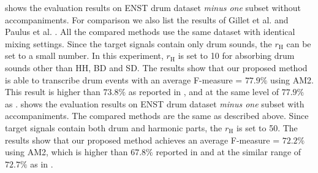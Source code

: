 \documentclass{article}
\begin{document}
 shows the evaluation results on ENST drum dataset \textit{minus one} subset without accompaniments. For comparison we also list the results of Gillet et al. \cite{gillet_transcription_2008} and Paulus et al. \cite{Paulus2009a}. All the compared methods use the same dataset with identical mixing settings. Since the target signals contain only drum sounds, the $r_\mathrm{H}$ can be set to a small number. In this experiment, $r_\mathrm{H}$ is set to 10 for absorbing drum sounds other than HH, BD and SD. The results show that our proposed method is able to transcribe drum events with an average F-measure = $77.9\%$ using AM2. This result is higher than $73.8\%$ as reported in \cite{gillet_transcription_2008}, and at the same level of $77.9\%$ as \cite{Paulus2009a}. %
 shows the evaluation results on ENST drum dataset \textit{minus one} subset with accompaniments. The compared methods are the same as described above. Since target signals contain both drum and harmonic parts, the $r_\mathrm{H}$ is set to 50. The results show that our proposed method achieves an average F-measure = $72.2\%$ using AM2, which is higher than $67.8\%$ reported in \cite{gillet_transcription_2008} and at the similar range of $72.7\%$ as in \cite{Paulus2009a}. %
\end{document}
